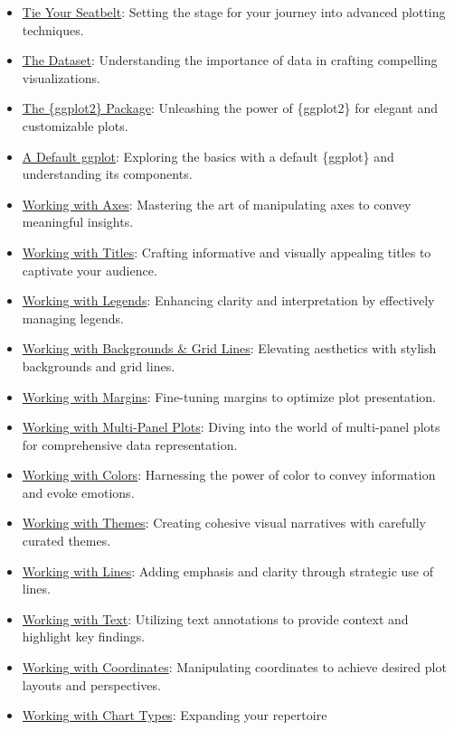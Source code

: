\documentclass[
  letterpaper,
]{scrbook}
\providecommand{\tightlist}{%
  \setlength{\itemsep}{0pt}\setlength{\parskip}{0pt}}\usepackage{longtable,booktabs,array}
\begin{document}
\begin{itemize}
\tightlist
\item
  \hyperref[prep]{Tie Your Seatbelt}: Setting the stage for your journey
  into advanced plotting techniques.
\item
  \hyperref[data]{The Dataset}: Understanding the importance of data in
  crafting compelling visualizations.
\item
  \hyperref[ggplot]{The \{ggplot2\} Package}: Unleashing the power of
  \{ggplot2\} for elegant and customizable plots.
\item
  \hyperref[default]{A Default ggplot}: Exploring the basics with a
  default \{ggplot\} and understanding its components.
\item
  \hyperref[axes]{Working with Axes}: Mastering the art of manipulating
  axes to convey meaningful insights.
\item
  \hyperref[titles]{Working with Titles}: Crafting informative and
  visually appealing titles to captivate your audience.
\item
  \hyperref[legends]{Working with Legends}: Enhancing clarity and
  interpretation by effectively managing legends.
\item
  \hyperref[style]{Working with Backgrounds \& Grid Lines}: Elevating
  aesthetics with stylish backgrounds and grid lines.
\item
  \hyperref[margins]{Working with Margins}: Fine-tuning margins to
  optimize plot presentation.
\item
  \hyperref[panels]{Working with Multi-Panel Plots}: Diving into the
  world of multi-panel plots for comprehensive data representation.
\item
  \hyperref[colors]{Working with Colors}: Harnessing the power of color
  to convey information and evoke emotions.
\item
  \hyperref[themes]{Working with Themes}: Creating cohesive visual
  narratives with carefully curated themes.
\item
  \hyperref[lines]{Working with Lines}: Adding emphasis and clarity
  through strategic use of lines.
\item
  \hyperref[text]{Working with Text}: Utilizing text annotations to
  provide context and highlight key findings.
\item
  \hyperref[coords]{Working with Coordinates}: Manipulating coordinates
  to achieve desired plot layouts and perspectives.
\item
  \hyperref[charts]{Working with Chart Types}: Expanding your repertoire

\end{itemize}
\end{document}
